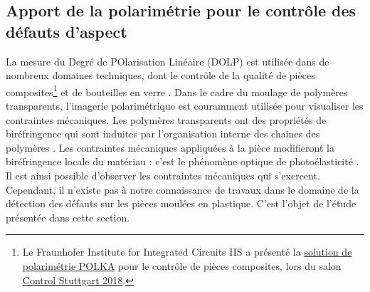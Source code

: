 


\subsection{Apport de la polarimétrie pour le contrôle des défauts d'aspect} \label{subsec:polarimetry}
La mesure du Degré de POlarisation Linéaire (DOLP) est utilisée dans de nombreux domaines techniques, dont le contrôle de la qualité de pièces composites\footnote{Le Fraunhofer Institute for Integrated Circuits IIS a présenté la \href{https://www.iis.fraunhofer.de/en/ff/sse/ims/tech/polarisationskamera.html}{solution de polarimétrie POLKA} pour le contrôle de pièces composites, lors du salon \href{https://www.control-messe.de/en/}{Control Stuttgart 2018}.} et de bouteilles en verre \cite{atkinson_highsensitivity_2018}.
Dans le cadre du moulage de polymères transparents, l'imagerie polarimétrique est couramment utilisée pour visualiser les contraintes mécaniques.
Les polymères transparents ont des propriétés de biréfringence qui sont induites par l'organisation interne des chaines des polymères \cite{denizart_thermal_1995}.
Les contraintes mécaniques appliquées à la pièce modifieront la biréfringence locale du matériau : c'est le phénomène optique de photoélasticité \cite{brewster_experiments_1833}.
Il est ainsi possible d'observer les contraintes mécaniques qui s'exercent.
Cependant, il n'existe pas à notre connaissance de travaux dans le domaine de la détection des défauts sur les pièces moulées en plastique.
C'est l'objet de l'étude présentée dans cette section.


